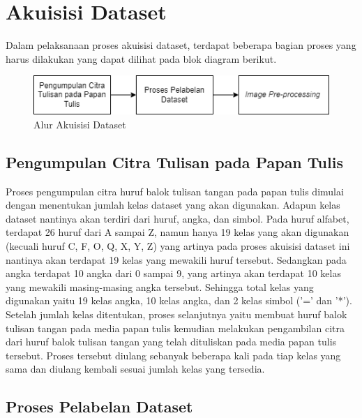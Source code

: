 
\section{Akuisisi Dataset}
\label{sec:akuisisidataset}

Dalam pelaksanaan proses akuisisi dataset, terdapat beberapa bagian proses yang harus dilakukan yang dapat dilihat pada blok diagram berikut.

\begin{figure}[H]
    \centering
    \includegraphics[scale=0.9]{gambar/metodologi_akuisisi_data.png}
    \caption{Alur Akuisisi Dataset}
    \label{fig:alurakuisisidataset}
\end{figure}

\subsection{Pengumpulan Citra Tulisan pada Papan Tulis}
\label{subsec:pengumpulancitra}

Proses pengumpulan citra huruf balok tulisan tangan pada papan tulis dimulai dengan menentukan jumlah kelas dataset yang akan digunakan. Adapun kelas dataset nantinya akan terdiri dari huruf, angka, dan simbol. Pada huruf alfabet, terdapat 26 huruf dari A sampai Z, namun hanya 19 kelas yang akan digunakan (kecuali huruf C, F, O, Q, X, Y, Z) yang artinya pada proses akuisisi dataset ini nantinya akan terdapat 19 kelas yang mewakili huruf tersebut. Sedangkan pada angka terdapat 10 angka dari 0 sampai 9, yang artinya akan terdapat 10 kelas yang mewakili masing-masing angka tersebut. Sehingga total kelas yang digunakan yaitu 19 kelas angka, 10 kelas angka, dan 2 kelas simbol ('=' dan '*'). Setelah jumlah kelas ditentukan, proses selanjutnya yaitu membuat huruf balok tulisan tangan pada media papan tulis kemudian melakukan pengambilan citra dari huruf balok tulisan tangan yang telah dituliskan pada media papan tulis tersebut. Proses tersebut diulang sebanyak beberapa kali pada tiap kelas yang sama dan diulang kembali sesuai jumlah kelas yang tersedia. \par

\subsection{Proses Pelabelan Dataset}
\label{subsec:proseslabelling}

